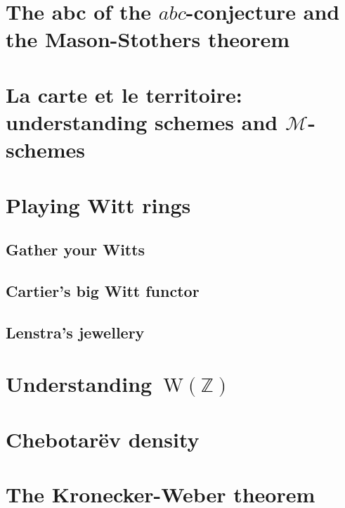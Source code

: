 \documentclass[a4paper]{memoir}
\begin{document}
\chapter{The abc of the $abc$-conjecture and the Mason-Stothers theorem}





\chapter{La carte et le territoire: understanding schemes and $\mathcal{M}$-schemes}








\chapter{Playing Witt rings}
\section{Gather your Witts}

\section{Cartier's big Witt functor}

\section{Lenstra's jewellery}



\chapter{Understanding~$\mathrm{W}(\mathbb{Z})$}






\chapter{Chebotar\"ev density}




\chapter{The Kronecker-Weber theorem}


\end{document}
